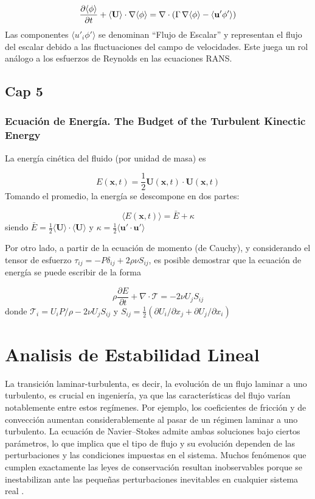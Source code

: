 $$\frac{\partial \langle \phi \rangle}{\partial t} + \langle \mathbf{U} \rangle \cdot \nabla  \langle \phi \rangle  = \nabla \cdot \left( \Gamma \hspace{0.5mm} \nabla \langle \phi \rangle - \langle \mathbf{u'} \phi' \rangle \right)$$
Las componentes $\langle u'_i \phi' \rangle$ se denominan ``Flujo de Escalar'' y representan el flujo del escalar debido a las fluctuaciones del campo de velocidades. Este juega un rol análogo a los esfuerzos de Reynolds en las ecuaciones RANS.


\subsection{Cap 5}

\subsubsection{Ecuación de Energía. The Budget of the Turbulent Kinectic Energy}

La energía cinética del fluido (por unidad de masa) es 

$$E(\mathbf{x},t) = \frac{1}{2} \mathbf{U}(\mathbf{x},t) \cdot \mathbf{U}(\mathbf{x},t) $$
Tomando el promedio, la energía se descompone en dos partes:

$$\langle E(\mathbf{x},t) \rangle = \bar{E} + \kappa$$
siendo  $\bar{E}= \frac{1}{2} \langle \mathbf{U} \rangle \cdot \langle \mathbf{U} \rangle$ y $\kappa = \frac{1}{2} \langle \mathbf{u'} \cdot \mathbf{u'} \rangle $

Por otro lado, a partir de la ecuación de momento (de Cauchy), y considerando el tensor de esfuerzo $\tau_{ij}=-P \delta_{ij} + 2 \rho \nu S_{ij}$, es posible demostrar que la ecuación de energía se puede escribir de la forma

$$\rho \frac{\partial E}{\partial t} + \nabla \cdot \mathcal{T} = - 2 \nu  U_j S_{ij}$$ 
donde $\mathcal{T}_i = U_i P / \rho - 2 \nu U_j S_{ij}$ y $S_{ij}=\frac{1}{2} (\partial U_i / \partial x_j + \partial U_j / \partial x_i )$







\section{Analisis de Estabilidad Lineal}

La transición laminar-turbulenta, es decir, la evolución de un flujo laminar a uno turbulento, es crucial en ingeniería, ya que las características del flujo varían notablemente entre estos regímenes. Por ejemplo, los coeficientes de fricción y de convección aumentan considerablemente al pasar de un régimen laminar a uno turbulento. La ecuación de Navier–Stokes admite ambas soluciones bajo ciertos parámetros, lo que implica que el tipo de flujo y su evolución dependen de las perturbaciones y las condiciones impuestas en el sistema. Muchos fenómenos que cumplen exactamente las leyes de conservación resultan inobservables porque se inestabilizan ante las pequeñas perturbaciones inevitables en cualquier sistema real \cite{kundu}.


